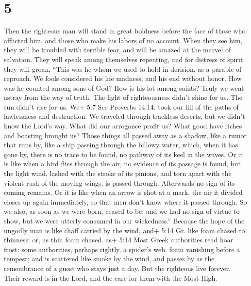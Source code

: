 \hypertarget{section-3}{%
\section{5}\label{section-3}}

 Then the righteous man will stand in great boldness before
the face of those who afflicted him, and those who make his labors of no
account.  When they see him, they will be troubled with
terrible fear, and will be amazed at the marvel of salvation.
 They will speak among themselves repenting, and for
distress of spirit they will groan, ``This was he whom we used to hold
in derision, as a parable of reproach.  We fools considered
his life madness, and his end without honor.  How was he
counted among sons of God? How is his lot among saints? 
Truly we went astray from the way of truth. The light of righteousness
didn't shine for us. The sun didn't rise for us.  We+ 5:7
See Proverbs 14:14. took our fill of the paths of lawlessness and
destruction. We traveled through trackless deserts, but we didn't know
the Lord's way.  What did our arrogance profit us? What good
have riches and boasting brought us?  Those things all
passed away as a shadow, like a rumor that runs by,  like a
ship passing through the billowy water, which, when it has gone by,
there is no trace to be found, no pathway of its keel in the waves.
 Or it is like when a bird flies through the air, no
evidence of its passage is found, but the light wind, lashed with the
stroke of its pinions, and torn apart with the violent rush of the
moving wings, is passed through. Afterwards no sign of its coming
remains.  Or it is like when an arrow is shot at a mark,
the air it divided closes up again immediately, so that men don't know
where it passed through.  So we also, as soon as we were
born, ceased to be; and we had no sign of virtue to show, but we were
utterly consumed in our wickedness.''  Because the hope of
the ungodly man is like chaff carried by the wind, and+ 5:14 Gr. like
foam chased to thinness: or, as thin foam chased. as+ 5:14 Most Greek
authorities read hoar frost: some authorities, perhaps rightly, a
spider's web. foam vanishing before a tempest; and is scattered like
smoke by the wind, and passes by as the remembrance of a guest who stays
just a day.  But the righteous live forever. Their reward
is in the Lord, and the care for them with the Most High. 
